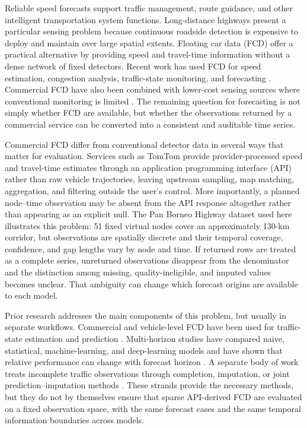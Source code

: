\documentclass[pdflatex,sn-basic,Numbered]{sn-jnl}
\begin{document}
Reliable speed forecasts support traffic management, route guidance, and other intelligent transportation system functions. Long-distance highways present a particular sensing problem because continuous roadside detection is expensive to deploy and maintain over large spatial extents. Floating car data (FCD) offer a practical alternative by providing speed and travel-time information without a dense network of fixed detectors. Recent work has used FCD for speed estimation, congestion analysis, traffic-state monitoring, and forecasting \cite{Zhang2025FCD}. Commercial FCD have also been combined with lower-cost sensing sources where conventional monitoring is limited \cite{Ipekyuz2025FCD}. The remaining question for forecasting is not simply whether FCD are available, but whether the observations returned by a commercial service can be converted into a consistent and auditable time series.

Commercial FCD differ from conventional detector data in several ways that matter for evaluation. Services such as TomTom provide provider-processed speed and travel-time estimates through an application programming interface (API) rather than raw vehicle trajectories, leaving upstream sampling, map matching, aggregation, and filtering outside the user's control. More importantly, a planned node--time observation may be absent from the API response altogether rather than appearing as an explicit null. The Pan Borneo Highway dataset used here illustrates this problem: 51 fixed virtual nodes cover an approximately 130-km corridor, but observations are spatially discrete and their temporal coverage, confidence, and gap lengths vary by node and time. If returned rows are treated as a complete series, unreturned observations disappear from the denominator and the distinction among missing, quality-ineligible, and imputed values becomes unclear. That ambiguity can change which forecast origins are available to each model.

Prior research addresses the main components of this problem, but usually in separate workflows. Commercial and vehicle-level FCD have been used for traffic-state estimation and prediction \cite{Ipekyuz2025FCD,Yu2024AutoformerFCD}. Multi-horizon studies have compared naive, statistical, machine-learning, and deep-learning models and have shown that relative performance can change with forecast horizon \cite{Hadry2025TrafficForecasting,Zeb2024FeatureProjection}. A separate body of work treats incomplete traffic observations through completion, imputation, or joint prediction--imputation methods \cite{Chen2024TrafficCompletion,Bikram2024Imputation,Qu2024TrafficPredictionImputation,Zhang2024MissingData}. These strands provide the necessary methods, but they do not by themselves ensure that sparse API-derived FCD are evaluated on a fixed observation space, with the same forecast cases and the same temporal information boundaries across models.
\end{document}
